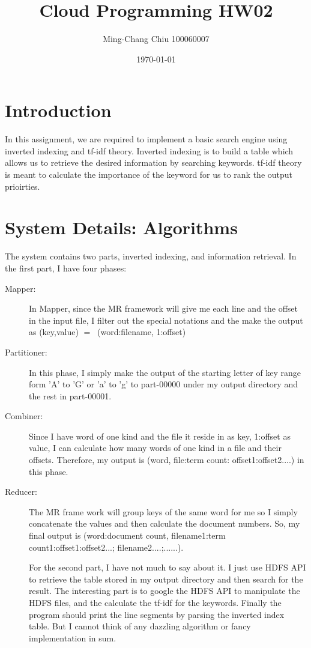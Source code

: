 \documentclass[12pt,a4paper]{article}
\title{Cloud Programming HW02}
\author{Ming-Chang Chiu 100060007}
\date{\today}
\begin{document}
\maketitle
\fontsize{12}{20pt}\selectfont %

\section{Introduction}

In this assignment, we are required to implement a basic search engine using inverted indexing and tf-idf theory. Inverted indexing is to build a table which allows us to retrieve the desired information by searching keywords. tf-idf theory is meant to calculate the importance of the keyword for us to rank the output prioirties.

\section{System Details: Algorithms}

The system contains two parts, inverted indexing, and information retrieval. In the first part, I have four phases:
\begin{description}
\item [Mapper:] In Mapper, since the MR framework will give me each line and the offset in the input file, I filter out the special notations and the make the output as (key,value) $=\>$ (word:filename, 1:offset)
\item [Partitioner:] In this phase, I simply make the output of the starting letter of key range form 'A' to 'G' or 'a' to 'g' to part-00000 under my output directory and the rest in part-00001.
\item [Combiner:] Since I have word of one kind and the file it reside in as key, 1:offset as value, I can calculate how many words of one kind in a file and their offsets. Therefore, my output is (word, file:term count: offset1:offset2....) in this phase.
\item [Reducer:] The MR frame work will group keys of the same word for me so I simply concatenate the values and then calculate the document numbers. So, my final output is (word:document count, filename1:term count1:offset1:offset2...; filename2....;......).

For the second part, I have not much to say about it. I just use HDFS API to retrieve the table stored in my output directory and then search for the result. The interesting part is to google the HDFS API to manipulate the HDFS files, and the calculate the tf-idf for the keywords. Finally the program should print the line segments by parsing the inverted index table. But I cannot think of any dazzling algorithm or fancy implementation in sum.
\end{description}
\end{document}
